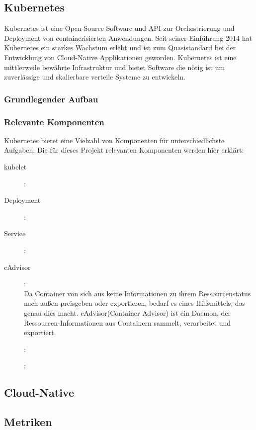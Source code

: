 \documentclass[a4paper,12pt]{scrartcl}
\begin{document}
\subsection{Kubernetes}

Kubernetes ist eine Open-Source Software und API zur Orchestrierung und Deployment von containerisierten Anwendungen. Seit seiner Einführung 2014 hat Kubernetes ein starkes Wachstum erlebt und ist zum Quasistandard bei der Entwicklung von Cloud-Native Applikationen geworden. Kubernetes ist eine mittlerweile bewährte Infrastruktur und bietet Software die nötig ist um zuverlässige und skalierbare verteile Systeme zu entwickeln. \cite{Burns.2019}

\subsubsection{Grundlegender Aufbau}



\subsubsection{Relevante Komponenten}

Kubernetes bietet eine Vielzahl von Komponenten für unterschiedlichste Aufgaben. Die für dieses Projekt relevanten Komponenten werden hier erklärt:

\begin{description}



\item [kubelet]:
\item [Deployment]:
\item [Service]:
\item [cAdvisor]:\\
Da Container von sich aus keine Informationen zu ihrem Ressourcenstatus nach außen preisgeben oder exportieren, bedarf es eines Hilfsmittels, das genau dies macht.
cAdvisor(Container Advisor) ist ein Daemon, der Ressourcen-Informationen aus Containern sammelt, verarbeitet und exportiert.\cite{.20200704T23:29:24.000Z}
\item []:
\item []:

\end{description}

\subsection{Cloud-Native}
\subsection{Metriken}
\end{document}
